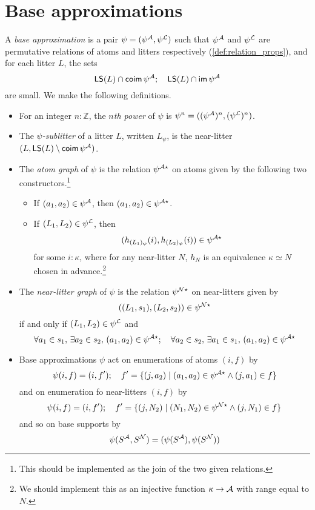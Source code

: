 \section{Base approximations}
\begin{definition}
  \label{def:BaseApprox}
  A \emph{base approximation} is a pair \( \psi = (\psi^{\mathcal A}, \psi^{\mathcal L}) \) such that \( \psi^{\mathcal A} \) and \( \psi^{\mathcal L} \) are permutative relations of atoms and litters respectively (\cref{def:relation_props}), and for each litter \( L \), the sets
  \[ \operatorname{\mathsf{LS}}(L) \cap \operatorname{\mathsf{coim}} \psi^{\mathcal A};\quad \operatorname{\mathsf{LS}}(L) \cap \operatorname{\mathsf{im}} \psi^{\mathcal A} \]
  are small.
  We make the following definitions.
  \begin{itemize}
    \item For an integer \( n : \mathbb Z \), the \emph{\( n \)th power} of \( \psi \) is \( \psi^n = ((\psi^{\mathcal A})^n, (\psi^{\mathcal L})^n) \).
    \item The \emph{\( \psi \)-sublitter} of a litter \( L \), written \( L_\psi \), is the near-litter \( (L, \operatorname{\mathsf{LS}}(L) \setminus \operatorname{\mathsf{coim}} \psi^{\mathcal A}) \).
    \item The \emph{atom graph} of \( \psi \) is the relation \( \psi^{{\mathcal A}\star} \) on atoms given by the following two constructors.\footnote{This should be implemented as the join of the two given relations.}
    \begin{itemize}
      \item If \( (a_1, a_2) \in \psi^{\mathcal A} \), then \( (a_1, a_2) \in \psi^{{\mathcal A}\star} \).
      \item If \( (L_1, L_2) \in \psi^{\mathcal L} \), then
      \[ (h_{(L_1)_\psi}(i), h_{(L_2)_\psi}(i)) \in \psi^{{\mathcal A}\star} \]
      for some \( i : \kappa \), where for any near-litter \( N \), \( h_N \) is an equivalence \( \kappa \simeq N \) chosen in advance.\footnote{We should implement this as an injective function \( \kappa \to {\mathcal A} \) with range equal to \( N \).}
    \end{itemize}
    \item The \emph{near-litter graph} of \( \psi \) is the relation \( \psi^{{\mathcal N}\star} \) on near-litters given by
    \[ ((L_1, s_1), (L_2, s_2)) \in \psi^{{\mathcal N}\star} \]
    if and only if \( (L_1, L_2) \in \psi^{\mathcal L} \) and
    \[ \forall a_1 \in s_1,\, \exists a_2 \in s_2,\, (a_1, a_2) \in \psi^{{\mathcal A}\star};\quad \forall a_2 \in s_2,\, \exists a_1 \in s_1,\, (a_1, a_2) \in \psi^{{\mathcal A}\star} \]
    \item Base approximations \( \psi \) act on enumerations of atoms \( (i, f) \) by
    \[ \psi(i, f) = (i, f');\quad f' = \{ (j, a_2) \mid (a_1, a_2) \in \psi^{{\mathcal A}\star} \wedge (j, a_1) \in f \} \]
    and on enumeration fo near-litters \( (i, f) \) by
    \[ \psi(i, f) = (i, f');\quad f' = \{ (j, N_2) \mid (N_1, N_2) \in \psi^{{\mathcal N}\star} \wedge (j, N_1) \in f \} \]
    and so on base supports by
    \[ \psi(S^{\mathcal A}, S^{\mathcal N}) = (\psi(S^{\mathcal A}), \psi(S^{\mathcal N})) \]
  \end{itemize}
\end{definition}
